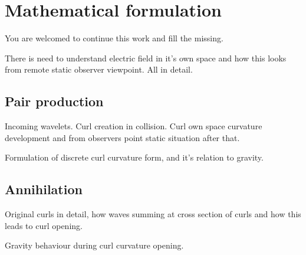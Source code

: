 %
%
%
\begin{comment}\end{comment}
\chapter{Mathematical formulation}

You are welcomed to continue this work and fill the missing.

There is need to understand electric field in it's own space and how this looks
from remote static observer viewpoint. All in detail.

\section{Pair production}
\label{pair_production}

Incoming wavelets. Curl creation in collision. Curl own space curvature
development and from observers point static situation after that.

Formulation of discrete curl curvature form, and it's relation to gravity.

\section{Annihilation}
\label{annihilation}

Original curls in detail, how waves summing at cross section of curls
and how this leads to curl opening.

Gravity behaviour during curl curvature opening.

\begin{comment}\end{comment}
